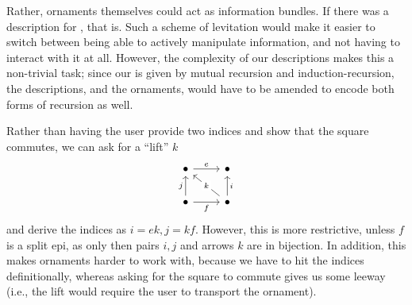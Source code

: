 \begin{remark}
    Rather, ornaments themselves could act as information bundles. If there was a description for , that is. Such a scheme of levitation would make it easier to switch between being able to actively manipulate information, and not having to interact with it at all. However, the complexity of our descriptions makes this a non-trivial task; since our  is given by mutual recursion and induction-recursion, the descriptions, and the ornaments, would have to be amended to encode both forms of recursion as well.
\end{remark} %

\begin{remark}\label{rem:orn-lift}
    Rather than having the user provide two indices and show that the square commutes, we can ask for a ``lift'' $k$
    \[\begin{tikzcd}
        \bullet & \bullet \\
        \bullet & \bullet
        \arrow["e", from=1-1, to=1-2]
        \arrow["f"', from=2-1, to=2-2]
        \arrow["j", from=2-1, to=1-1]
        \arrow["i"', from=2-2, to=1-2]
        \arrow["k"{description}, from=2-2, to=1-1]
    \end{tikzcd}\]
    and derive the indices as $i = ek, j = kf$. However, this is more restrictive, unless $f$ is a split epi, as only then pairs $i,j$ and arrows $k$ are in bijection. In addition, this makes ornaments harder to work with, because we have to hit the indices definitionally, whereas asking for the square to commute gives us some leeway (i.e., the lift would require the user to transport the ornament). 
\end{remark}

\begin{remark}
\end{remark} %

